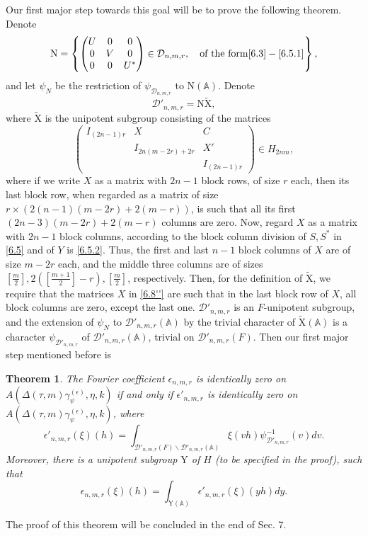 \documentclass[12pts]{amsart}
\newcommand{\BA}{{\mathbb {A}}}
\newtheorem{thm}{Theorem}[section]
\begin{document}
Our first major step towards this goal will be to prove the following theorem. Denote
\begin{equation}\label{6.8}
\mathrm{N}=\left
\{\begin{pmatrix}U&0&0\\0&V&0\\0&0&U^*\end{pmatrix}\in
\mathcal{D}_{n,m,r},\quad \textrm{of the form}
\eqref{6.3}-\eqref{6.5.1}\right\},
\end{equation}
and let $\psi_N$ be the restriction of $\psi_{\mathcal{D}_{n,m,r}}$
to $\mathrm{N}(\BA)$. Denote
\begin{equation}\label{6.8'}
\mathcal{D'}_{n,m,r}=\mathrm{N}\widetilde{\mathrm{X}},
\end{equation}
where $\widetilde{\mathrm{X}}$ is the unipotent subgroup consisting
of the matrices
\begin{equation}\label{6.8''}
\begin{pmatrix}I_{(2n-1)r}&X&C\\&I_{2n(m-2r)+2r}&X'\\&&I_{(2n-1)r}\end{pmatrix}\in
H_{2nm},
\end{equation}
where if we write $X$ as a matrix with $2n-1$ block rows, of size
$r$ each, then its last block row, when regarded as a matrix of size
$r\times (2(n-1)(m-2r)+2(m-r))$, is such that all its first $(2n-3)(m-2r)+2(m-r)$
columns are zero. Now, regard $X$ as a matrix with $2n-1$ block columns, according
to the block column division of $S, S^*$ in \eqref{6.5} and of $Y$ is \eqref{6.5.2}. Thus, the first and last $n-1$ block columns
of $X$ are of size $m-2r$ each, and the middle three columns are of sizes $[\frac{m}{2}], 2([\frac{m+1}{2}]-r), [\frac{m}{2}]$, respectively.
Then, for the definition of $\widetilde{\mathrm{X}}$, we require that the matrices $X$ in \eqref{6.8''} are such that in the last
block row of $X$, all block columns are zero, except the last one.
$\mathcal{D'}_{n,m,r}$ is an $F$-unipotent
subgroup, and the extension of $\psi_N$ to
$\mathcal{D'}_{n,m,r}(\BA)$ by the trivial character of
$\widetilde{\mathrm{X}}(\BA)$ is a character
$\psi_{\mathcal{D'}_{n,m,r}}$ of $\mathcal{D'}_{n,m,r}(\BA)$,
trivial on $\mathcal{D'}_{n,m,r}(F)$. 
Then our first major step
mentioned before is
\begin{thm}\label{thm 6.1}
The Fourier coefficient $\epsilon_{n,m,r}$ is identically zero on
$A(\Delta(\tau,m)\gamma_\psi^{(\epsilon)},\eta,k)$ if and only if
$\epsilon'_{n,m,r}$ is identically zero on
$A(\Delta(\tau,m)\gamma_\psi^{(\epsilon)},\eta,k)$, where
$$
\epsilon'_{n,m,r}(\xi)(h)=\int_{\mathcal{D'}_{n,m,r}(F)\backslash
\mathcal{D'}_{n,m,r}(\BA)}\xi(vh)\psi_{\mathcal{D'}_{n,m,r}}^{-1}(v)dv.
$$
Moreover, there is a unipotent subgroup $\mathrm{Y}$ of $H$ (to be specified in the proof), such that 
$$
\epsilon_{n,m,r}(\xi)(h)=\int_{\mathrm{Y}(\BA)}\epsilon'_{n,m,r}(\xi)(yh)dy.
$$ 
\end{thm}
The proof of this theorem will be concluded in the end of Sec. 7.
\bigskip
\end{document}
